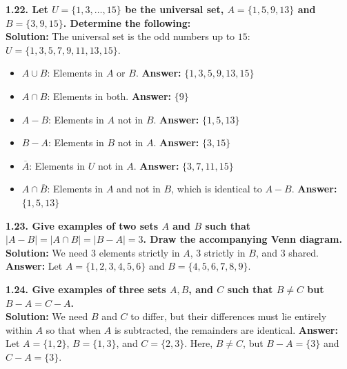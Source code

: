 \documentclass[12pt]{article}
\begin{document}
\textbf{1.22. Let $U = \{1, 3, \dots, 15\}$ be the universal set, $A = \{1, 5, 9, 13\}$ and $B = \{3, 9, 15\}$. Determine the following:} \\
\textbf{Solution:} 
The universal set is the odd numbers up to $15$: $U = \{1, 3, 5, 7, 9, 11, 13, 15\}$.
\begin{itemize}
    \item[(a)] $A \cup B$: Elements in $A$ or $B$. \textbf{Answer:} $\{1, 3, 5, 9, 13, 15\}$
    \item[(b)] $A \cap B$: Elements in both. \textbf{Answer:} $\{9\}$
    \item[(c)] $A - B$: Elements in $A$ not in $B$. \textbf{Answer:} $\{1, 5, 13\}$
    \item[(d)] $B - A$: Elements in $B$ not in $A$. \textbf{Answer:} $\{3, 15\}$
    \item[(e)] $\overline{A}$: Elements in $U$ not in $A$. \textbf{Answer:} $\{3, 7, 11, 15\}$
    \item[(f)] $A \cap \overline{B}$: Elements in $A$ and not in $B$, which is identical to $A - B$. \textbf{Answer:} $\{1, 5, 13\}$
\end{itemize}

\vspace{0.5cm}
\textbf{1.23. Give examples of two sets $A$ and $B$ such that $|A - B| = |A \cap B| = |B - A| = 3$. Draw the accompanying Venn diagram.} \\
\textbf{Solution:}
We need $3$ elements strictly in $A$, $3$ strictly in $B$, and $3$ shared.
\textbf{Answer:} Let $A = \{1, 2, 3, 4, 5, 6\}$ and $B = \{4, 5, 6, 7, 8, 9\}$. 
\begin{center}
\end{center}

\vspace{0.5cm}
\textbf{1.24. Give examples of three sets $A, B$, and $C$ such that $B \neq C$ but $B - A = C - A$.} \\
\textbf{Solution:}
We need $B$ and $C$ to differ, but their differences must lie entirely within $A$ so that when $A$ is subtracted, the remainders are identical.
\textbf{Answer:} Let $A = \{1, 2\}$, $B = \{1, 3\}$, and $C = \{2, 3\}$.
Here, $B \neq C$, but $B - A = \{3\}$ and $C - A = \{3\}$.
\end{document}
